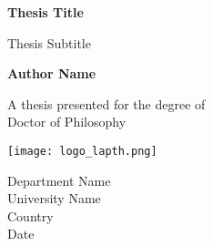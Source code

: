 \begin{titlepage}
   \begin{center}
       \vspace*{1cm}

       \textbf{Thesis Title}

       \vspace{0.5cm}
        Thesis Subtitle
            
       \vspace{1.5cm}

       \textbf{Author Name}

       \vfill
            
       A thesis presented for the degree of\\
       Doctor of Philosophy
            
       \vspace{0.8cm}
     
       \texttt{[image: logo\_lapth.png]}
            
       Department Name\\
       University Name\\
       Country\\
       Date
            
   \end{center}
\end{titlepage}
